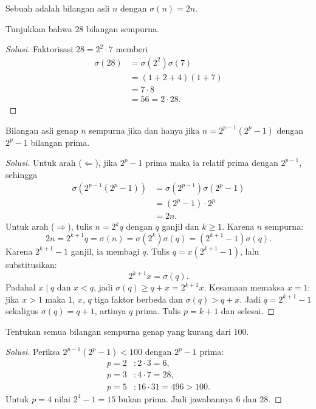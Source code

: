 \documentclass[12pt]{scrartcl}
\begin{document}
\begin{definition}
Sebuah  adalah bilangan asli $n$
dengan $\sigma(n) = 2n$.
\end{definition}

\begin{example}
Tunjukkan bahwa $28$ bilangan sempurna.
\end{example}
\begin{proof}[Solusi]
Faktorisasi $28 = 2^2 \cdot 7$ memberi
\begin{align*}
\sigma(28) &= \sigma(2^2)\sigma(7) \\
&= (1 + 2 + 4)(1 + 7) \\
&= 7 \cdot 8 \\
&= 56 = 2 \cdot 28.
\end{align*}
\end{proof}

\begin{theorem}
Bilangan asli genap $n$ sempurna jika dan hanya jika
$n = 2^{p-1}(2^p - 1)$ dengan $2^p - 1$ bilangan prima.
\end{theorem}

\begin{proof}[Solusi]
Untuk arah ($\Leftarrow$), jika $2^p - 1$ prima maka ia relatif prima dengan $2^{p-1}$,
sehingga
\begin{align*}
\sigma(2^{p-1}(2^p - 1)) &= \sigma(2^{p-1})\sigma(2^p - 1) \\
&= (2^p - 1) \cdot 2^p \\
&= 2n.
\end{align*}
Untuk arah ($\Rightarrow$), tulis $n = 2^k q$ dengan $q$ ganjil dan $k \ge 1$.
Karena $n$ sempurna:
\[ 2n = 2^{k+1}q = \sigma(n) = \sigma(2^k)\sigma(q) = (2^{k+1} - 1)\sigma(q). \]
Karena $2^{k+1} - 1$ ganjil, ia membagi $q$.
Tulis $q = x(2^{k+1} - 1)$, lalu substitusikan:
\[ 2^{k+1}x = \sigma(q). \]
Padahal $x \mid q$ dan $x < q$, jadi $\sigma(q) \ge q + x = 2^{k+1}x$.
Kesamaan memaksa $x = 1$: jika $x > 1$ maka $1$, $x$, $q$ tiga faktor berbeda
dan $\sigma(q) > q + x$. Jadi $q = 2^{k+1} - 1$ sekaligus $\sigma(q) = q + 1$,
artinya $q$ prima. Tulis $p = k + 1$ dan selesai.
\end{proof}

\begin{example}
Tentukan semua bilangan sempurna genap yang kurang dari $100$.
\end{example}
\begin{proof}[Solusi]
Periksa $2^{p-1}(2^p - 1) < 100$ dengan $2^p - 1$ prima:
\begin{align*}
p = 2 &: 2 \cdot 3 = 6, \\
p = 3 &: 4 \cdot 7 = 28, \\
p = 5 &: 16 \cdot 31 = 496 > 100.
\end{align*}
Untuk $p = 4$ nilai $2^4 - 1 = 15$ bukan prima.
Jadi jawabannya $6$ dan $28$.
\end{proof}
\end{document}
